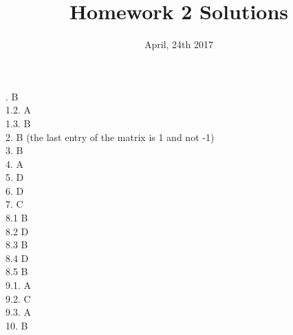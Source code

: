 \documentclass{exam}
\title{Homework 2 Solutions}
\date{April, 24th 2017}
\begin{document}
\maketitle

. B \\
1.2. A \\
1.3. B \\
2. B (the last entry of the matrix is 1 and not -1)\\
3. B \\
4. A \\
5. D \\
6. D \\
7. C \\
8.1 B \\
8.2 D \\
8.3 B \\
8.4 D \\
8.5 B \\
9.1. A \\
9.2. C \\
9.3. A \\
10.  B
\end{document}
